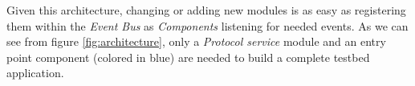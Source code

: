 Given this architecture, changing or adding new modules is as easy as registering them within the \textit{Event Bus} as \textit{Components} listening for needed events. As we can see from figure \ref{fig:architecture}, only a \emph{Protocol service} module and an entry point component (colored in blue) are needed to build a complete testbed application.
